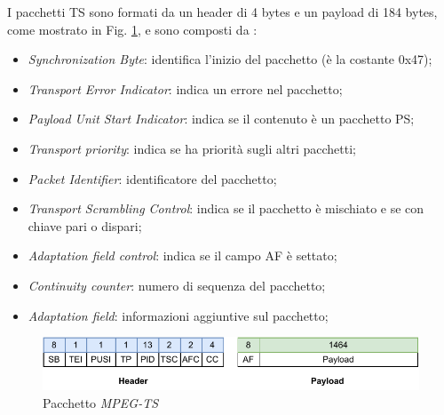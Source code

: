 I pacchetti TS sono formati da un header di 4 bytes e un payload di 184 bytes, come mostrato in Fig. \ref{fig:TS_Packet}, e sono composti da \parencite{RetiInternetMultimediali}:

\begin{itemize}
    \item \textit{Synchronization Byte}: identifica l'inizio del pacchetto (è la costante 0x47);
    \item \textit{Transport Error Indicator}: indica un errore nel pacchetto;
    \item \textit{Payload Unit Start Indicator}: indica se il contenuto è un pacchetto PS;
    \item \textit{Transport priority}: indica se ha priorità sugli altri pacchetti;
    \item \textit{Packet Identifier}: identificatore del pacchetto;
    \item \textit{Transport Scrambling Control}: indica se il pacchetto è mischiato e se con chiave pari o dispari;
	\item \textit{Adaptation field control}: indica se il campo AF è settato;
    \item \textit{Continuity counter}: numero di sequenza del pacchetto;
    \item \textit{Adaptation field}: informazioni aggiuntive sul pacchetto;
\end{itemize}

\begin{figure}[H]
	\includegraphics[width=\linewidth]{immagini/TS_Packet}
	\caption{Pacchetto \textit{MPEG-TS}}
	\label{fig:TS_Packet}
\end{figure}